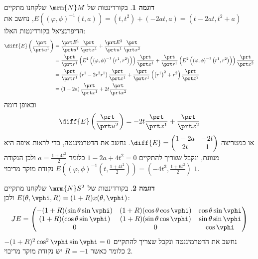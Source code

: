 \documentclass{article}
\theoremstyle{definition}
\newtheorem*{example*}{דוגמה}
\begin{document}
	\begin{example*}
		בקורדינטות של
		\(\mrm{N} M\)
		שלקחנו מתקיים
		\(
			E(\left(\varphi,\phi\right)^{-1}(t,a))
			=(t,t^2)+(-2at,a)
			=(t-2at,t^2+a)
		\),
		נחשב את הדיפרנציאל בקורדינטות האלו:
		\begin{equation*}\begin{split}
			\diff{E}\left(\frac{\prt}{\prt u^1}\right)
			&=\frac{\prt E^1}{\prt u^1} \frac{\prt}{\prt x^1}
			+\frac{\prt E^2}{\prt u^1} \frac{\prt}{\prt x^2}
			\\&=\frac{\prt}{\prt r^1}\left(E^1\left(\left(\varphi,\phi\right)^{-1}\left(r^1,r^2\right)\right)\right) \frac{\prt}{\prt x^1}
			+\frac{\prt}{\prt r^1}\left(E^2\left(\left(\varphi,\phi\right)^{-1}\left(r^1,r^2\right)\right)\right) \frac{\prt}{\prt x^2}
			\\&=\frac{\prt}{\prt r^1}\left(r^1-2r^2 r^1\right) \frac{\prt}{\prt x^1}
			+\frac{\prt}{\prt r^1}\left(\left(r^1\right)^2+r^2\right) \frac{\prt}{\prt x^2}
			\\&=\left(1-2a\right) \frac{\prt}{\prt x^1}
			+2t \frac{\prt}{\prt x^2}
		\end{split}\end{equation*}
		ובאופן דומה
		\[
			\diff{E}\left(\frac{\prt}{\prt u^2}\right)
			=-2t \frac{\prt}{\prt x^1}
			+\frac{\prt}{\prt x^2}
		\]
		או כמטריצה
		\(
			\diff{E}
			=\begin{pmatrix}
				1-2a & -2t
				\\
				2t & 1
			\end{pmatrix}
		\).
		נחשב את הדטרמיננטה, כדי לראות איפה היא מנוונת, ונקבל שצריך להתקיים
		\(1-2a+4t^2=0\)
		כלומר
		\(a=\frac{1+4t^2}{2}\)
		ולכן הנקודה
		\(
			E(\left(\varphi,\phi\right)^{-1}(t,\frac{1+4t^2}{2}))
			=\left(-4t^3,\frac{1+6t^2}{2}\right)
		\)
		נקודת מוקד מריבוי \(1\).
	\end{example*}

	\begin{example*}
		בקורדינטות של
		\(\mrm{N} S^2\)
		שלקחנו מתקיים
		\(
		E(\theta,\vphi,R) = (1+R)x(\theta,\vphi)
		\)
		ולכן:
		\[
			JE = \begin{pmatrix}
				-(1+R)(\sin\theta \sin\vphi) & (1+R)(\cos\theta \cos\vphi) & \cos\theta \sin\vphi
				\\
				(1+R)(\cos\theta \sin\vphi) & (1+R)(\sin\theta \cos\vphi) & \sin\theta \sin\vphi
				\\
				0 & 0 & \cos \vphi
			\end{pmatrix}
		\]
		נחשב את הדטרמיננטה ונקבל שצריך להתקיים
		\(-(1+R)^2 \cos^2\vphi \sin\vphi=0\)
		כלומר כאשר
		\(R=-1\)
		יש נקודת מוקד מריבוי \(2\).
	\end{example*}
\end{document}
